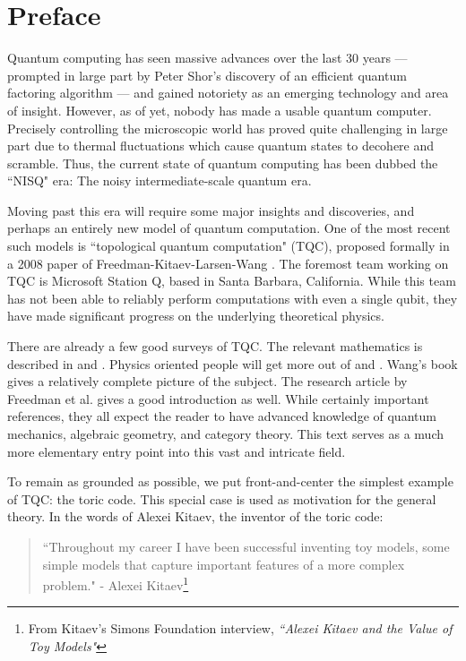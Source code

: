 \documentclass{article}
\theoremstyle{definition}
\numberwithin{figure}{section}
\begin{document}
\section{Preface}
\label{Preface}

Quantum computing has seen massive advances over the last 30 years — prompted in large part by Peter Shor's discovery of an efficient quantum factoring algorithm \cite{shor1994algorithms} — and gained notoriety as an emerging technology and area of insight. However, as of yet, nobody has made a usable quantum computer. Precisely controlling the microscopic world has proved quite challenging in large part due to thermal fluctuations which cause quantum states to decohere and scramble. Thus, the current state of quantum computing has been dubbed the ``NISQ" era: The noisy intermediate-scale quantum era.

Moving past this era will require some major insights and discoveries, and perhaps an entirely new model of quantum computation. One of the most recent such models is ``topological quantum computation" (TQC), proposed formally in a 2008 paper of Freedman-Kitaev-Larsen-Wang \cite{freedman2003topological}. The foremost team working on TQC is Microsoft Station Q, based in Santa Barbara, California. While this team has not been able to reliably perform computations with even a single qubit, they have made significant progress on the underlying theoretical physics.

There are already a few good surveys of TQC. The relevant mathematics is described in \cite{bakalov2001lectures} and \cite{rowell2018mathematics}. Physics oriented people will get more out of \cite{preskill1999lecture} and \cite{nayak2008non}. Wang's book \cite{wang2010topological} gives a relatively complete picture of the subject. The research article by Freedman et al. \cite{freedman2002simulation} gives a good introduction as well. While certainly important references, they all expect the reader to have advanced knowledge of quantum mechanics, algebraic geometry, and category theory. This text serves as a much more elementary entry point into this vast and intricate field.

To remain as grounded as possible, we put front-and-center the simplest example of TQC: the toric code. This special case is used as motivation for the general theory. In the words of Alexei Kitaev, the inventor of the toric code:

\begin{quote}
``Throughout my career I have been successful inventing toy models, some simple models that capture important features of a more complex problem." - Alexei Kitaev\footnote{From Kitaev's Simons Foundation interview, \textit{``Alexei Kitaev and the Value of Toy Models"}}
\end{quote}
\end{document}
